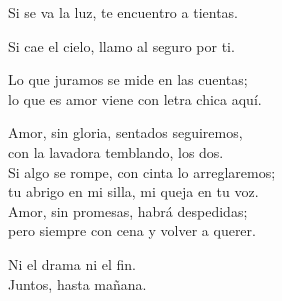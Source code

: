 \begin{lyrics}
Si se va la luz, te encuentro a tientas.

Si cae el cielo, llamo al seguro por ti.

Lo que juramos se mide en las cuentas;\\
lo que es amor viene con letra chica aquí.

Amor, sin gloria, sentados seguiremos,\\
con la lavadora temblando, los dos.\\
Si algo se rompe, con cinta lo arreglaremos;\\
tu abrigo en mi silla, mi queja en tu voz.\\
Amor, sin promesas, habrá despedidas;\\
pero siempre con cena y volver a querer.

Ni el drama ni el fin.\\
Juntos, hasta mañana.
\end{lyrics}

